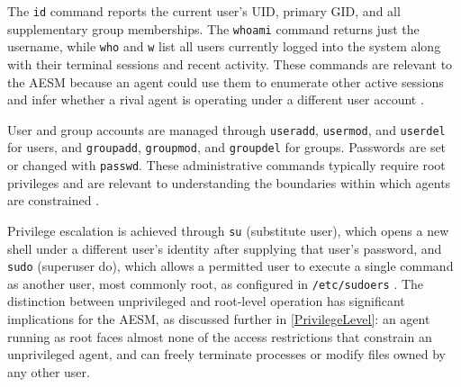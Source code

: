 The \texttt{id} command reports the current user's UID, primary GID, and all supplementary group memberships. The \texttt{whoami} command returns just the username, while \texttt{who} and \texttt{w} list all users currently logged into the system along with their terminal sessions and recent activity. These commands are relevant to the AESM because an agent could use them to enumerate other active sessions and infer whether a rival agent is operating under a different user account \parencite{LinuxManPages}.

User and group accounts are managed through \texttt{useradd}, \texttt{usermod}, and \texttt{userdel} for users, and \texttt{groupadd}, \texttt{groupmod}, and \texttt{groupdel} for groups. Passwords are set or changed with \texttt{passwd}. These administrative commands typically require root privileges and are relevant to understanding the boundaries within which agents are constrained \parencite{KernelCredentials}.

Privilege escalation is achieved through \texttt{su} (substitute user), which opens a new shell under a different user's identity after supplying that user's password, and \texttt{sudo} (superuser do), which allows a permitted user to execute a single command as another user, most commonly root, as configured in \texttt{/etc/sudoers} \parencite{LinuxManPages}. The distinction between unprivileged and root-level operation has significant implications for the AESM, as discussed further in \autoref{PrivilegeLevel}: an agent running as root faces almost none of the access restrictions that constrain an unprivileged agent, and can freely terminate processes or modify files owned by any other user.